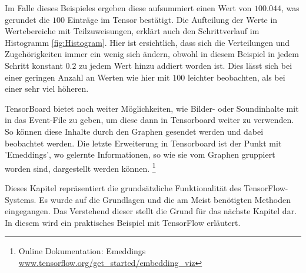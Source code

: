 Im Falle dieses Beispieles ergeben diese aufsummiert einen Wert von $100.044$, was gerundet die $100$ Einträge im Tensor bestätigt. 
Die Aufteilung der Werte in Wertebereiche mit Teilzuweisungen, erklärt auch den Schrittverlauf im Histogramm \ref{fig:Histogram}. 
Hier ist ersichtlich, dass sich die Verteilungen und Zugehörigkeiten immer ein wenig sich ändern, obwohl in diesem Beispiel in jedem Schritt konstant $0.2$ zu jedem Wert hinzu addiert worden ist. 
Dies lässt sich bei einer geringen Anzahl an Werten wie hier mit $100$ leichter beobachten, als bei einer sehr viel höheren. 
\phantom \newline

\noindent
TensorBoard bietet noch weiter Möglichkeiten, wie Bilder- oder Soundinhalte mit in das Event-File zu geben, um diese dann in Tensorboard weiter zu verwenden. 
So können diese Inhalte durch den Graphen gesendet werden und dabei beobachtet werden. 
Die letzte Erweiterung in Tensorboard ist der Punkt mit 'Emeddings', wo gelernte Informationen, so wie sie vom Graphen gruppiert worden sind, dargestellt werden können. \footnote{Online Dokumentation: Emeddings \url{www.tensorflow.org/get_started/embedding_viz}}
\phantom \newline

\noindent
Dieses Kapitel repräsentiert die grundsätzliche Funktionalität des TensorFlow-Systems. 
Es wurde auf die Grundlagen und die am Meist benötigten Methoden eingegangen. 
Das Verstehend dieser stellt die Grund für das nächste Kapitel dar. 
In diesem wird ein praktisches Beispiel mit TensorFlow erläutert. 








